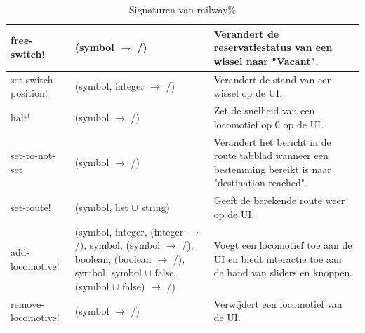 \documentclass{article}
\begin{document}
\begin{table}[h!]
\begin{tabular}{|p{2.9cm}|p{4cm}|p{6.1cm}|}
                \hline
                free-switch! & (symbol $\rightarrow$ /) & Verandert de reservatiestatus van een wissel naar "Vacant".\\ 
                \hline
                set-switch-position! & (symbol, integer $\rightarrow$ /) & Verandert de stand van een wissel op de UI.\\
                \hline
                halt! & (symbol $\rightarrow$ /) & Zet de snelheid van een locomotief op 0 op de UI.\\
                \hline
                set-to-not-set & (symbol $\rightarrow$ /) & Verandert het bericht in de route tabblad wanneer een bestemming bereikt is naar "destination reached".\\
                \hline
                set-route! & (symbol, list $\cup$ string) & Geeft de berekende route weer op de UI.\\
                \hline
                add-locomotive! & (symbol, integer, (integer $\rightarrow$ /), symbol, (symbol $\rightarrow$ /),
                boolean, (boolean $\rightarrow$ /), symbol, symbol $\cup$ false, (symbol $\cup$ false) $\rightarrow$ /) & Voegt een locomotief toe aan de UI en biedt interactie toe aan de hand van sliders en knoppen.\\
                \hline
                remove-locomotive! & (symbol $\rightarrow$ /) & Verwijdert een locomotief van de UI.\\
                \hline
        \end{tabular}
        \caption{Signaturen van railway\%}
\end{table}
\end{document}
